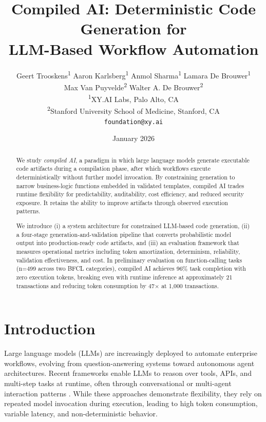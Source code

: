 \documentclass[11pt]{article}
\title{Compiled AI: Deterministic Code Generation for\\LLM-Based Workflow Automation}
\author{
  Geert Trooskens\textsuperscript{1} \quad
  Aaron Karlsberg\textsuperscript{1} \quad
  Anmol Sharma\textsuperscript{1} \quad
  Lamara De Brouwer\textsuperscript{1} \\[0.3em]
  Max Van Puyvelde\textsuperscript{2} \quad
  Walter A. De Brouwer\textsuperscript{2}
  \\[1em]
  \textsuperscript{1}XY.AI Labs, Palo Alto, CA \\
  \textsuperscript{2}Stanford University School of Medicine, Stanford, CA \\[0.5em]
  \texttt{foundation@xy.ai}
}
\date{January 2026}
\begin{document}
\maketitle

\begin{abstract}

We study \emph{compiled AI}, a paradigm in which large language models generate executable code artifacts during a compilation phase, after which workflows execute deterministically without further model invocation. By constraining generation to narrow business-logic functions embedded in validated templates, compiled AI trades runtime flexibility for predictability, auditability, cost efficiency, and reduced security exposure. It retains the ability to improve artifacts through observed execution patterns.

We introduce (i) a system architecture for constrained LLM-based code generation, (ii) a four-stage generation-and-validation pipeline that converts probabilistic model output into production-ready code artifacts, and (iii) an evaluation framework that measures operational metrics including token amortization, determinism, reliability, validation effectiveness, and cost. In preliminary evaluation on function-calling tasks (n=499 across two BFCL categories), compiled AI achieves 96\% task completion with zero execution tokens, breaking even with runtime inference at approximately 21 transactions and reducing token consumption by 47$\times$ at 1,000 transactions.

\end{abstract}

\section{Introduction}
\label{sec:introduction}

Large language models (LLMs) are increasingly deployed to automate enterprise workflows, evolving from question-answering systems toward autonomous agent architectures. Recent frameworks enable LLMs to reason over tools, APIs, and multi-step tasks at runtime, often through conversational or multi-agent interaction patterns \citep{autogen2024, crewai2024, langchain2022}. While these approaches demonstrate flexibility, they rely on repeated model invocation during execution, leading to high token consumption, variable latency, and non-deterministic behavior.
\end{document}
